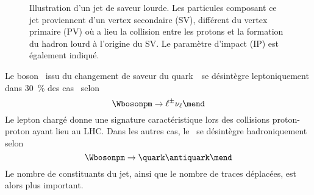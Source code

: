 \begin{figure}[h]
\centering
{}
\caption[Illustration d'un jet de saveur lourde.]{Illustration d'un jet de saveur lourde. Les particules composant ce jet proviennent d'un vertex secondaire (SV), différent du vertex primaire (PV) où a lieu la collision entre les protons et la formation du hadron lourd à l'origine du SV. Le paramètre d'impact (IP) est également indiqué.}
\label{fig-chapter-JERC-section-jets_reco-subsec-flavor-SV_scheme}
\end{figure}
\par Le boson \Wboson\ issu du changement de saveur du quark~\quarkb\ se désintègre leptoniquement dans \SI{30}{\%} des cas~\cite{PDG_booklet_2020} selon
\begin{equation}
\Wbosonpm \to \ell^\pm \nu_\ell
\mend
\end{equation}
Le lepton chargé donne une signature caractéristique lors des collisions proton-proton ayant lieu au LHC. Dans les autres cas, le \Wboson\ se désintègre hadroniquement selon
\begin{equation}
\Wbosonpm \to \quark\antiquark
\mend
\end{equation}
Le nombre de constituants du jet, ainsi que le nombre de traces déplacées, est alors plus important.
